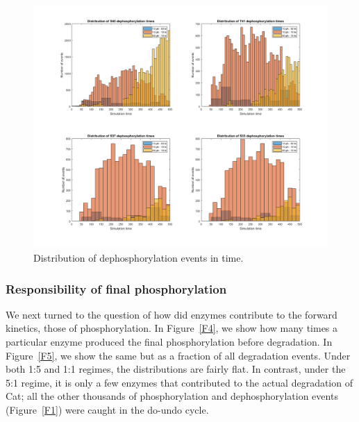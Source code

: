 \begin{figure}[p]
  \centering
  \includegraphics[scale=0.35]{wnt/F3_distribution_of_dephosphorylations_in_time}
  \caption{Distribution of dephosphorylation events in time.}
  \label{F3}
\end{figure}

\subsubsection*{Responsibility of final phosphorylation}

We next turned to the question of how did enzymes contribute to the
forward kinetics, those of phosphorylation. In Figure~\ref{F4}, we
show how many times a particular enzyme produced the final
phosphorylation before degradation. In Figure~\ref{F5}, we show the
same but as a fraction of all degradation events. Under both 1:5 and
1:1 regimes, the distributions are fairly flat. In contrast, under the
5:1 regime, it is only a few enzymes that contributed to the actual
degradation of Cat; all the other thousands of phosphorylation and
dephosphorylation events (Figure~\ref{F1}) were caught in the do-undo
cycle.

